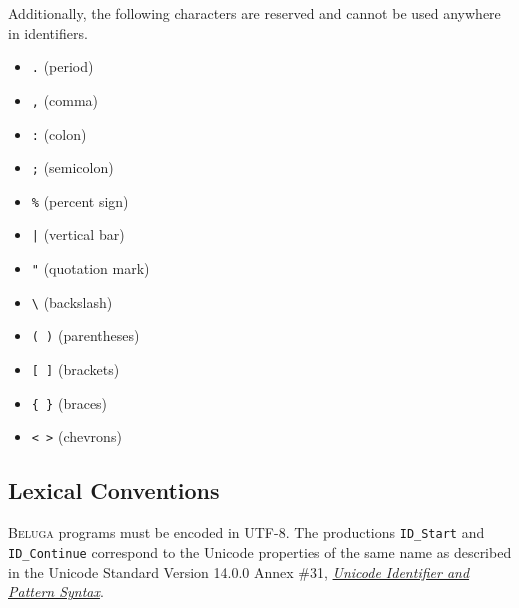 \documentclass[11pt]{article}
\newcommand{\Beluga}{\textsc{Beluga}\xspace}
\begin{document}
Additionally, the following characters are reserved and cannot be used anywhere in identifiers.

{\setlength{\columnseprule}{0.4pt}
\begin{multicols}{3}
\begin{itemize}[label={}]
\item \texttt{.} \hfill (period)
\item \texttt{,} \hfill (comma)
\item \texttt{:} \hfill (colon)
\item \texttt{;} \hfill (semicolon)
\item \texttt{\%} \hfill (percent sign)
\item \texttt{|} \hfill (vertical bar)
\item \texttt{"} \hfill (quotation mark)
\item \texttt{\textbackslash} \hfill (backslash)
\item \texttt{( )} \hfill (parentheses)
\item \texttt{[ ]} \hfill (brackets)
\item \texttt{\{ \}} \hfill (braces)
\item \texttt{< >} \hfill (chevrons)
\end{itemize}
\end{multicols}
}

\subsection{Lexical Conventions}

\Beluga programs must be encoded in \textsc{UTF-8}.
The productions \texttt{ID\_Start} and \texttt{ID\_Continue} correspond to the Unicode properties of the same name as described in the Unicode Standard Version 14.0.0 Annex \#31, \href{https://www.unicode.org/reports/tr31/tr31-35.html}{\textit{Unicode Identifier and Pattern Syntax}}.
\end{document}
